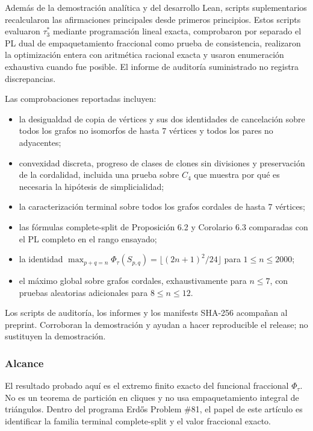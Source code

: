 \documentclass[spanish,11pt,a4paper]{article}
\providecommand{\tightlist}{\setlength{\itemsep}{0pt}\setlength{\parskip}{0pt}}
\begin{document}
Además de la demostración analítica y del desarrollo Lean, scripts
suplementarios recalcularon las afirmaciones principales desde primeros
principios. Estos scripts evaluaron \(\tau_3^*\) mediante programación
lineal exacta, comprobaron por separado el PL dual de empaquetamiento
fraccional como prueba de consistencia, realizaron la optimización
entera con aritmética racional exacta y usaron enumeración exhaustiva
cuando fue posible. El informe de auditoría suministrado no registra
discrepancias.

Las comprobaciones reportadas incluyen:

\begin{itemize}
\tightlist
\item
  la desigualdad de copia de vértices y sus dos identidades de
  cancelación sobre todos los grafos no isomorfos de hasta \(7\)
  vértices y todos los pares no adyacentes;
\item
  convexidad discreta, progreso de clases de clones sin divisiones y
  preservación de la cordalidad, incluida una prueba sobre \(C_4\) que
  muestra por qué es necesaria la hipótesis de simplicialidad;
\item
  la caracterización terminal sobre todos los grafos cordales de hasta
  \(7\) vértices;
\item
  las fórmulas complete-split de Proposición 6.2 y Corolario 6.3
  comparadas con el PL completo en el rango ensayado;
\item
  la identidad
  \(\max_{p+q=n}\Phi_\tau(S_{p,q})=\lfloor(2n+1)^2/24\rfloor\) para
  \(1\le n\le2000\);
\item
  el máximo global sobre grafos cordales, exhaustivamente para
  \(n\le7\), con pruebas aleatorias adicionales para \(8\le n\le12\).
\end{itemize}

Los scripts de auditoría, los informes y los manifests SHA-256 acompañan
al preprint. Corroboran la demostración y ayudan a hacer reproducible el
release; no sustituyen la demostración.

\subsubsection{Alcance}\label{alcance}

El resultado probado aquí es el extremo finito exacto del funcional
fraccional \(\Phi_\tau\). No es un teorema de partición en cliques y no
usa empaquetamiento integral de triángulos. Dentro del programa Erdős
Problem \#81, el papel de este artículo es identificar la familia
terminal complete-split y el valor fraccional exacto.
\end{document}
